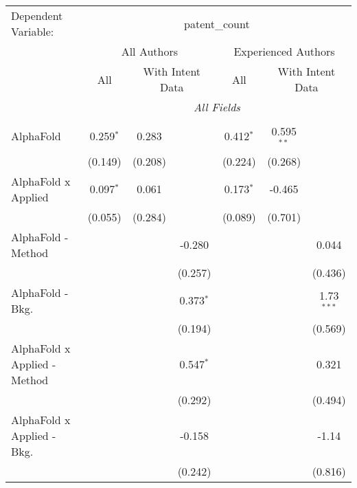 \begingroup
\centering
\begin{tabular}{lcccccc}
   \tabularnewline \midrule \midrule
   Dependent Variable: & \multicolumn{6}{c}{patent\_count}\\
 & \multicolumn{3}{c}{All Authors} & \multicolumn{3}{c}{Experienced Authors} \\
\cmidrule(lr){2-4} \cmidrule(lr){5-7}
 & \multicolumn{1}{c}{All} & \multicolumn{2}{c}{With Intent Data} & \multicolumn{1}{c}{All} & \multicolumn{2}{c}{With Intent Data} \\
\cmidrule(lr){2-2} \cmidrule(lr){3-4} \cmidrule(lr){5-5} \cmidrule(lr){6-7}
 & \multicolumn{6}{c}{\textit{All Fields}} \\ \\
   AlphaFold                      & 0.259$^{*}$   & 0.283   &              & 0.412$^{*}$   & 0.595$^{**}$ &   \\   
                                  & (0.149)       & (0.208) &              & (0.224)       & (0.268)      &   \\   
   AlphaFold x Applied            & 0.097$^{*}$   & 0.061   &              & 0.173$^{*}$   & -0.465       &   \\   
                                  & (0.055)       & (0.284) &              & (0.089)       & (0.701)      &   \\   
   AlphaFold - Method             &               &         & -0.280       &               &              & 0.044\\   
                                  &               &         & (0.257)      &               &              & (0.436)\\   
   AlphaFold - Bkg.               &               &         & 0.373$^{*}$  &               &              & 1.73$^{***}$\\   
                                  &               &         & (0.194)      &               &              & (0.569)\\   
   AlphaFold x Applied - Method   &               &         & 0.547$^{*}$  &               &              & 0.321\\   
                                  &               &         & (0.292)      &               &              & (0.494)\\   
   AlphaFold x Applied - Bkg.     &               &         & -0.158       &               &              & -1.14\\   
                                  &               &         & (0.242)      &               &              & (0.816)\\   

\end{tabular}
